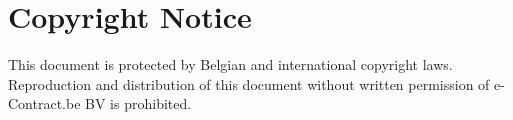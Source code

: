 %

\chapter*{Copyright Notice}
This document is protected by Belgian and international copyright laws.
Reproduction and distribution of this document without written permission of e-Contract.be BV is prohibited.